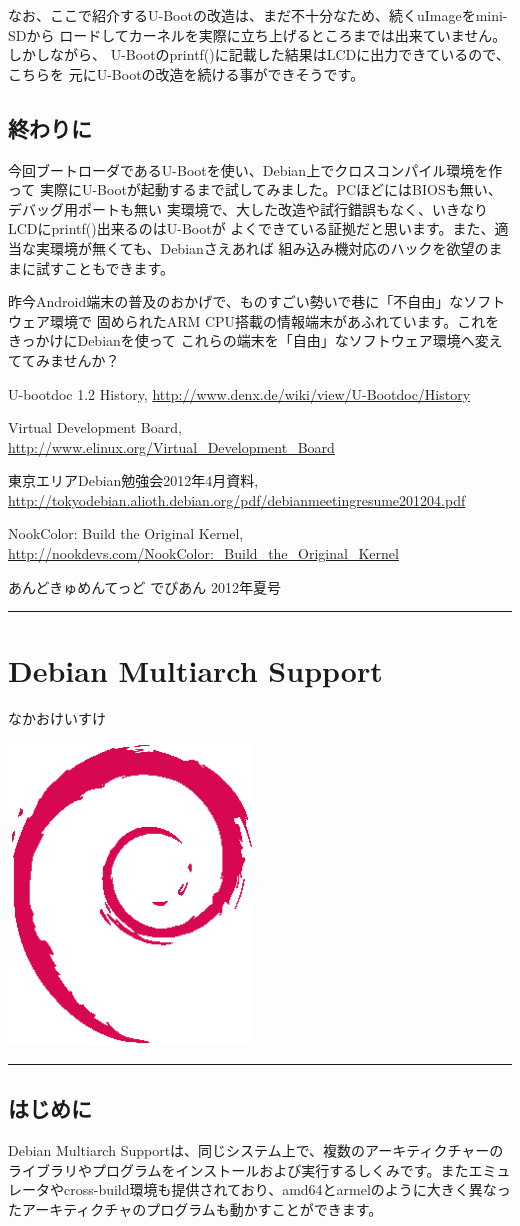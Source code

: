 \documentclass[mingoth,a4paper]{jsarticle}
\renewcommand{\dancersection}[2]{%
\newpage
あんどきゅめんてっど でびあん 2012年夏号
%
\vspace{0.1mm}\\
{\color{dancerdarkblue}\rule{\hsize}{2mm}}

%
%
\begin{minipage}[t]{0.6\hsize}
\color{dancerdarkblue}
\vspace{1cm}
\section{#1}
\hfill{}#2\\
\end{minipage}
\begin{minipage}[t]{0.4\hsize}
\vspace{-2cm}
\hfill{}\includegraphics[height=8cm]{image200502/openlogo-nd.eps}\\
\vspace{-5cm}
\end{minipage}
%
{\color{dancerlightblue}\rule{0.66\hsize}{2mm}}
%
\vspace{2cm}
}
\begin{document}
なお、ここで紹介するU-Bootの改造は、まだ不十分なため、続くuImageをmini-SDから
ロードしてカーネルを実際に立ち上げるところまでは出来ていません。しかしながら、
U-Bootのprintf()に記載した結果はLCDに出力できているので、こちらを
元にU-Bootの改造を続ける事ができそうです。

\subsection{終わりに}

今回ブートローダであるU-Bootを使い、Debian上でクロスコンパイル環境を作って
実際にU-Bootが起動するまで試してみました。PCほどにはBIOSも無い、デバッグ用ポートも無い
実環境で、大した改造や試行錯誤もなく、いきなりLCDにprintf()出来るのはU-Bootが
よくできている証拠だと思います。また、適当な実環境が無くても、Debianさえあれば
組み込み機対応のハックを欲望のままに試すこともできます。

昨今Android端末の普及のおかげで、ものすごい勢いで巷に「不自由」なソフトウェア環境で
固められたARM CPU搭載の情報端末があふれています。これをきっかけにDebianを使って
これらの端末を「自由」なソフトウェア環境へ変えててみませんか？

\begin{thebibliography}{0}

U-bootdoc 1.2 History,
\url{http://www.denx.de/wiki/view/U-Bootdoc/History}

Virtual Development Board,
\url{http://www.elinux.org/Virtual_Development_Board}

東京エリアDebian勉強会2012年4月資料,
\url{http://tokyodebian.alioth.debian.org/pdf/debianmeetingresume201204.pdf}

NookColor: Build the Original Kernel,
 \url{http://nookdevs.com/NookColor:_Build_the_Original_Kernel}

\end{thebibliography}

\dancersection{Debian Multiarch Support}{なかおけいすけ}
\label{sec:Multiarch}

\subsection{はじめに}
Debian Multiarch Supportは、同じシステム上で、複数のアーキティクチャーのライブラリやプログラムをインストールおよび実行するしくみです。またエミュレータやcross-build環境も提供されており、amd64とarmelのように大きく異なったアーキティクチャのプログラムも動かすことができます。
\end{document}
